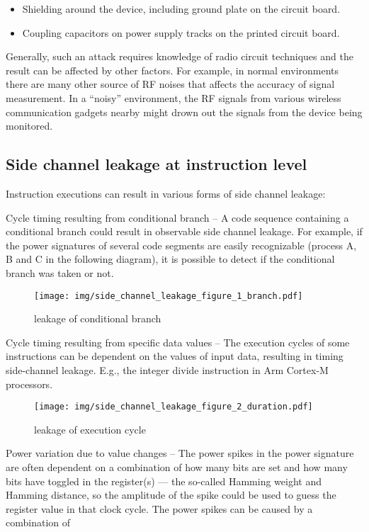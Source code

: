 \documentclass[
  a4paper,
]{report}
\providecommand{\tightlist}{%
  \setlength{\itemsep}{0pt}\setlength{\parskip}{0pt}}
\begin{document}
\begin{itemize}
\tightlist
\item
  Shielding around the device, including ground plate on the circuit
  board.
\item
  Coupling capacitors on power supply tracks on the printed circuit
  board.
\end{itemize}

Generally, such an attack requires knowledge of radio circuit techniques
and the result can be affected by other factors. For example, in normal
environments there are many other source of RF noises that affects the
accuracy of signal measurement. In a ``noisy'' environment, the RF
signals from various wireless communication gadgets nearby might drown
out the signals from the device being monitored.

\subsection{Side channel leakage at instruction
level}\label{side-channel-leakage-at-instruction-level}

Instruction executions can result in various forms of side channel
leakage:

Cycle timing resulting from conditional branch -- A code sequence
containing a conditional branch could result in observable side channel
leakage. For example, if the power signatures of several code segments
are easily recognizable (process A, B and C in the following diagram),
it is possible to detect if the conditional branch was taken or not.

\begin{figure}
\centering
\texttt{[image: img/side\_channel\_leakage\_figure\_1\_branch.pdf]}
\caption{leakage of conditional branch}
\end{figure}

Cycle timing resulting from specific data values -- The execution cycles
of some instructions can be dependent on the values of input data,
resulting in timing side-channel leakage. E.g., the integer divide
instruction in Arm Cortex-M processors.

\begin{figure}
\centering
\texttt{[image: img/side\_channel\_leakage\_figure\_2\_duration.pdf]}
\caption{leakage of execution cycle}
\end{figure}

Power variation due to value changes -- The power spikes in the power
signature are often dependent on a combination of how many bits are set
and how many bits have toggled in the register(s) --- the so-called
Hamming weight and Hamming distance, so the amplitude of the spike could
be used to guess the register value in that clock cycle. The power
spikes can be caused by a combination of
\end{document}
